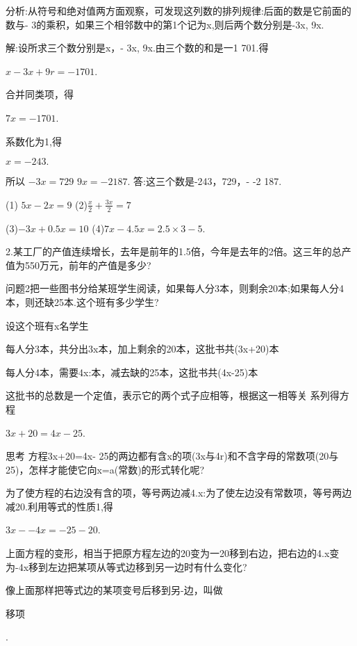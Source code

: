 \documentclass{article}
\begin{document}
\begin{article}
\begin{example}
      分析:从符号和绝对值两方面观察，可发现这列数的排列规律:后面的数是它前面的数与- 3的乘积，如果三个相邻数中的第1个记为x,则后两个数分别是-3x, 9x.      
      
      解:设所求三个数分别是x，- 3x, 9x.由三个数的和是一1 701.得 
      
      $x-3x+9r=-1701$. 
      
      合并同类项，得 
      
      $7x=-1 701$. 
      
      系数化为1,得
      
      $x=-243.$      
      
      所以      
      $-3x=729$ $9x=-2187$.
      答:这三个数是-243，729，- -2 187.
      \end{example}
      
      \begin{exercise}
      (1) $5x-2x=9$  (2)$\frac{x}{2}+\frac{3x}{2}=7$
      
      (3)$-3x+0.5x=10$ (4)$7x-4.5x=2.5\times3-5$.
      
      2.某工厂的产值连续增长，去年是前年的1.5倍，今年是去年的2倍。这三年的总产值为550万元，前年的产值是多少?
      \end{exercise}
      
      \begin{example}
      问题2把一些图书分给某班学生阅读，如果每人分3本，则剩余20本;如果每人分4本，则还缺25本.这个班有多少学生?
      
      设这个班有x名学生
      
      每人分3本，共分出3x本，加上剩余的20本，这批书共(3x+20)本
      
      每人分4本，需要4x:本，减去缺的25本，这批书共(4x-25)本
      
      这批书的总数是一个定值，表示它的两个式子应相等，根据这一相等关 系列得方程
      
      $3x+20=4x-25$.
     
     思考
     方程3x+20=4x- 25的两边都有含x的项(3x与4r)和不含字母的常数项(20与25)，怎样才能使它向x=a(常数)的形式转化呢?
     
     为了使方程的右边没有含的项，等号两边减4.x:为了使左边没有常数项，等号两边减20.利用等式的性质1,得
     
     $3x--4x=-25-20$.
     
     上面方程的变形，相当于把原方程左边的20变为一20移到右边，把右边的4.x变为-4x移到左边把某项从等式边移到另一边时有什么变化?
     
     像上面那样把等式边的某项变号后移到另-边，叫做\begin{defination}移项\end{defination}.
    \end{example}
    

\end{article}
\end{document}

